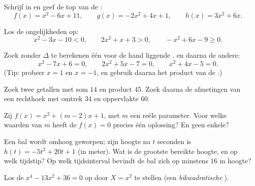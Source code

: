 \begin{exercise}[$\star$]\label{exo:g11:quad:2}
Schrijf in  en geef de top van de :
\[
f(x) = x^2 - 6x + 11, \qquad
g(x) = -2x^2 + 4x + 1, \qquad
h(x) = 3x^2 + 6x .
\]
\end{exercise}

\begin{exercise}[$\star$]\label{exo:g11:quad:3}
Los de ongelijkheden op:
\[
x^2 - 3x - 10 < 0, \qquad
2x^2 + x + 3 > 0, \qquad
-x^2 + 6x - 9 \geq 0 .
\]
\end{exercise}

\begin{exercise}[$\star$]\label{exo:g11:quad:4}
Zoek zonder $\Delta$ te berekenen één voor de hand liggende , en
daarna de andere:
\[
x^2 - 7x + 6 = 0, \qquad
2x^2 + 5x - 7 = 0, \qquad
x^2 + 4x - 5 = 0 .
\]
(Tip: probeer $x = 1$ en $x = -1$, en gebruik daarna het product van de
.)
\end{exercise}

\begin{exercise}[$\star\star$]\label{exo:g11:quad:5}
Zoek twee getallen met som $14$ en product $45$. Zoek daarna de afmetingen
van een rechthoek met omtrek $34$ en oppervlakte $60$.
\end{exercise}

\begin{exercise}[$\star\star$]\label{exo:g11:quad:6}
Zij $f(x) = x^2 + (m-2)x + 1$, met $m$ een reële parameter. Voor welke
waarden van $m$ heeft de  $f(x) = 0$ precies één oplossing? En
geen enkele?
\end{exercise}

\begin{exercise}[$\star\star$]\label{exo:g11:quad:7}
Een bal wordt omhoog geworpen; zijn hoogte na $t$ seconden is
$h(t) = -5t^2 + 20t + 1$ (in meter). Wat is de grootste bereikte hoogte, en
op welk tijdstip? Op welk tijdsinterval bevindt de bal zich op minstens
$16$ m hoogte?
\end{exercise}

\begin{exercise}[$\star\star$]\label{exo:g11:quad:8}
Los de  $x^4 - 13x^2 + 36 = 0$ op door $X = x^2$ te stellen (een
\emph{bikwadratische} ).
\end{exercise}

